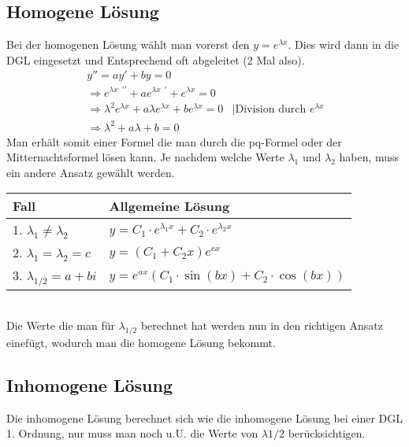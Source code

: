 \documentclass[a4paper,10pt]{scrartcl}
\begin{document}
        \subsection*{Homogene Lösung}
        Bei der homogenen Lösung wählt man vorerst den \(y = e^{\lambda x}\). Dies wird dann in die DGL eingesetzt und Entsprechend oft abgeleitet (2 Mal also).
        \begin{equation}
            \begin{aligned}
                & y'' = a y' + by = 0 \\
                & \Rightarrow e^{\lambda x} \;^{\prime \prime}  + a e^{\lambda x} \;^{\prime} + e^{\lambda x} = 0 \\
                & \Rightarrow \lambda^2 e^{\lambda x}  + a\lambda e^{\lambda x} + be^{\lambda x} = 0 & |\text{Division durch \(e^{\lambda x}\) } \\
                & \Rightarrow \lambda^2 + a \lambda + b = 0
            \end{aligned}
        \end{equation} 
        Man erhält somit einer Formel die man durch die pq-Formel oder der Mitternachtsformel lösen kann. Je nachdem welche Werte \(\lambda_1\) und \(\lambda_2\) haben,
        muss ein andere Ansatz gewählt werden. \\
        \begin{tabular}{|p{3cm}|p{6cm}|}
            \hline 
            Fall & Allgemeine Lösung \\
            \hline
            1. \(\lambda_1 \neq \lambda_2\) & \(y = C_1 \cdot e^{\lambda_1 x} + C_2 \cdot e^{\lambda_2 x}\) \\
            \hline
            2. \(\lambda_1 = \lambda_2 = c\) & \(y = (C_1 + C_2x) e^{cx}\) \\
            \hline
            3. \(\lambda_{1/2} = a + bi \) & \(y = e^{ax}( C_1 \cdot \sin (bx) + C_2 \cdot \cos (bx) )\) \\
            \hline
        \end{tabular} \\
        Die Werte die man für \(\lambda_{1/2}\) berechnet hat werden nun in den richtigen Ansatz einefügt, wodurch man die homogene Lösung bekommt.  
        
        \subsection*{Inhomogene Lösung}
        Die inhomogene Lösung berechnet sich wie die inhomogene Lösung bei einer DGL 1. Ordnung, nur muss man noch u.U. die Werte von \(\lambda{1/2}\) berücksichtigen.
    
\end{document}
